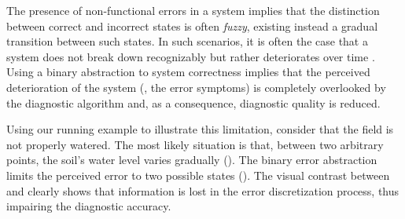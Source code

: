 The presence of non-functional errors in a system implies that the
distinction between correct and incorrect states is often
\textit{fuzzy}, existing instead a gradual transition between such states.
%
In such scenarios, it is often the case that a system does not break
down recognizably but rather deteriorates over time \cite{Ghosh07}.
%
Using a binary abstraction to system correctness implies that the
perceived deterioration of the system (\ie, the error symptoms) is
completely overlooked by the diagnostic algorithm and, as a
consequence, diagnostic quality is reduced.

Using our running example to illustrate this limitation, consider that
the field is not properly watered.
%
The most likely situation is that, between two arbitrary points, the
soil's water level varies gradually
().
%
The binary error abstraction limits the perceived error to two
possible states ().
%
The visual contrast between
 and
 clearly shows that
information is lost in the error discretization process, thus
impairing the diagnostic accuracy.


